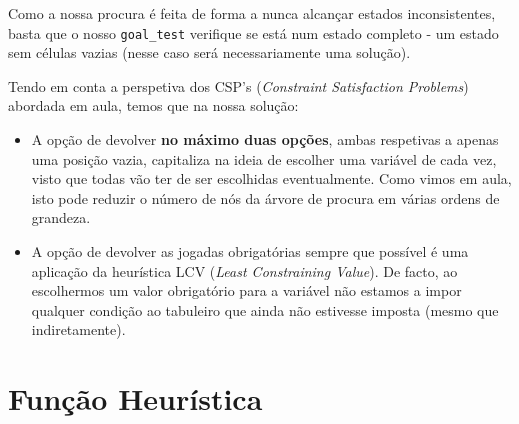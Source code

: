 \documentclass[12pt,a4paper]{article}
\begin{document}
Como a nossa procura é feita de forma a nunca alcançar estados inconsistentes, basta
que o nosso \texttt{goal\_test} verifique se está num estado completo - um estado
sem células vazias (nesse caso será necessariamente uma solução).

Tendo em conta a perspetiva dos CSP's (\textit{Constraint Satisfaction Problems})
abordada em aula, temos que na nossa solução:
\begin{itemize}
      \item A opção de devolver \textbf{no máximo duas opções}, ambas respetivas a apenas uma
            posição vazia, capitaliza na ideia de escolher uma variável de cada vez, visto
            que todas vão ter de ser escolhidas eventualmente.
            Como vimos em aula, isto pode reduzir o número de nós da árvore de procura
            em várias ordens de grandeza.
      \item A opção de devolver as jogadas obrigatórias sempre que possível é uma
            aplicação da heurística LCV (\textit{Least Constraining Value}).
            De facto, ao escolhermos um valor obrigatório para a variável não estamos
            a impor qualquer condição ao tabuleiro que ainda não estivesse imposta
            (mesmo que indiretamente).
\end{itemize}

\section*{Função Heurística}
\end{document}
